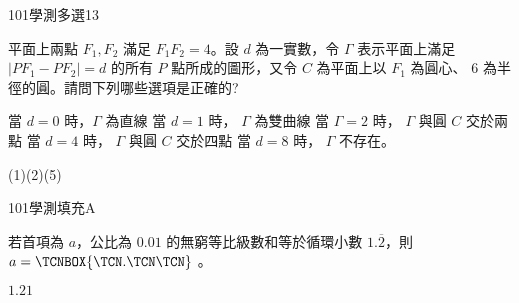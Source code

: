     \begin{QUESTION}
        \begin{ExamInfo}{101}{學測}{多選}{13}
        \end{ExamInfo}
        \begin{ExamAnsRateInfo}{45}{79}{40}{16}
        \end{ExamAnsRateInfo}
        \begin{QBODY}
            平面上兩點 $F_1,F_2$ 滿足 $F_1F_2 =4$。設 $d$ 為一實數，令 $\Gamma$ 表示平面上滿足 $|PF_1 -PF_2|=d$ 的所有 $P$ 點所成的圖形，又令 $C$ 為平面上以 $F_1$ 為圓心、 6 為半徑的圓。請問下列哪些選項是正確的?
			\begin{QOPS}
				\QOP 當 $d = 0$ 時，$\Gamma$ 為直線 
				\QOP 當 $d =1$ 時， $\Gamma$ 為雙曲線 
				\QOP 當 $\Gamma = 2$ 時， $\Gamma$ 與圓 $C$ 交於兩點 
				\QOP 當 $d = 4$ 時， $\Gamma$ 與圓 $C$ 交於四點 
				\QOP 當 $d = 8$ 時， $\Gamma$ 不存在。
			\end{QOPS}
        \end{QBODY}
        \begin{QFROMS}
        \end{QFROMS}
        \begin{QTAGS}\end{QTAGS}
        \begin{QANS}
            (1)(2)(5)
        \end{QANS}
        \begin{QSOLLIST}
        \end{QSOLLIST}
        \begin{QEMPTYSPACE}
        \end{QEMPTYSPACE}
    \end{QUESTION}
    \begin{QUESTION}
        \begin{ExamInfo}{101}{學測}{填充}{A}
        \end{ExamInfo}
        \begin{ExamAnsRateInfo}{44}{86}{39}{7}
        \end{ExamAnsRateInfo}
        \begin{QBODY}
            若首項為 $a$，公比為 $0.01$ 的無窮等比級數和等於循環小數 $1.\overline{2}$，則 $a=\TCNBOX{\TCN.\TCN\TCN}$ 。
        \end{QBODY}
        \begin{QFROMS}
        \end{QFROMS}
        \begin{QTAGS}\end{QTAGS}
        \begin{QANS}
            $1.21$
        \end{QANS}
        \begin{QSOLLIST}
        \end{QSOLLIST}
        \begin{QEMPTYSPACE}
        \end{QEMPTYSPACE}
    \end{QUESTION}
